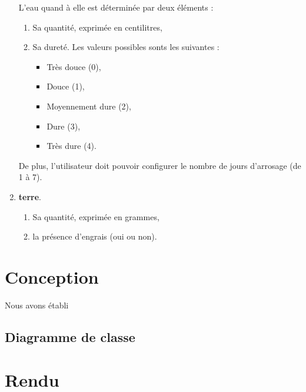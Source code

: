 \documentclass[a4paper,10pt]{article}
\begin{document}
\begin{enumerate}
L'eau quand à elle est déterminée par deux éléments :
\begin{enumerate}
	\item Sa quantité, exprimée en centilitres,
	\item Sa dureté. Les valeurs possibles sonts les suivantes :
		\begin{itemize}
			\item Très douce (0),
			\item Douce (1),
			\item Moyennement dure (2),
			\item Dure (3),
			\item Très dure (4).
		\end{itemize}
	\end{enumerate}
De plus, l'utilisateur doit pouvoir configurer le nombre de jours d'arrosage (de 1 à 7).

 \item \textbf{terre}.
	\begin{enumerate}
	\item Sa quantité, exprimée en grammes,
	\item la présence d'engrais (oui ou non).
	\end{enumerate}
\end{enumerate}


\section{Conception}
Nous avons établi 
\subsection{Diagramme de classe}
\section{Rendu}
\end{document}
